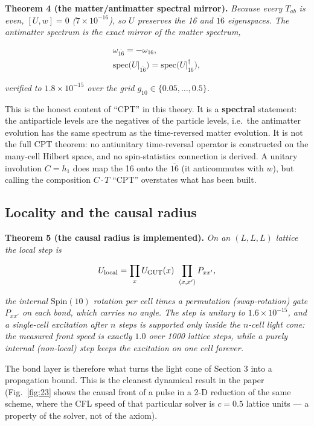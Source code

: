 \documentclass[aps,prd,twocolumn,amsmath,amssymb,superscriptaddress,nofootinbib,floatfix]{revtex4-2}
\begin{document}
\textbf{Theorem 4 (the matter/antimatter spectral mirror).}
\emph{Because every \(T_{ab}\) is even, \([U,w] = 0\)
(\(7\times10^{-16}\)), so \(U\) preserves the 16 and \(\overline{16}\)
eigenspaces. The antimatter spectrum is the exact mirror of the matter
spectrum,}

\begin{multline}
    \omega_{\overline{16}} = -\omega_{16},\qquad \\
    \mathrm{spec}\big(U\big|_{\overline{16}}\big) = \mathrm{spec}\big(U\big|_{16}^\dagger\big),
\end{multline}

\emph{verified to \(1.8\times10^{-15}\) over the grid
\(g_{10} \in \{0.05,\dots,0.5\}\).}

This is the honest content of ``CPT'' in this theory. It is a
\textbf{spectral} statement: the antiparticle levels are the negatives
of the particle levels, i.e.~the antimatter evolution has the same
spectrum as the time-reversed matter evolution. It is not the full CPT
theorem: no antiunitary time-reversal operator is constructed on the
many-cell Hilbert space, and no spin-statistics connection is derived. A
unitary involution \(C = h_1\) does map the 16 onto the
\(\overline{16}\) (it anticommutes with \(w\)), but calling the
composition \(C\cdot T\) ``CPT'' overstates what has been built.

\subsection{Locality and the causal
radius}\label{locality-and-the-causal-radius}

\textbf{Theorem 5 (the causal radius is implemented).} \emph{On an
\((L,L,L)\) lattice the local step is}

\[U_{\rm local} = \prod_x U_{\rm GUT}(x)\ \prod_{\langle x,x'\rangle} P_{xx'},\]

\emph{the internal \(\mathrm{Spin}(10)\) rotation per cell times a
permutation (swap-rotation) gate \(P_{xx'}\) on each bond, which carries
no angle. The step is unitary to \(1.6\times10^{-15}\), and a
single-cell excitation after \(n\) steps is supported only inside the
\(n\)-cell light cone: the measured front speed is exactly \(1.0\) over
1000 lattice steps, while a purely internal (non-local) step keeps the
excitation on one cell forever.}

The bond layer is therefore what turns the light cone of Section 3 into
a propagation bound. This is the cleanest dynamical result in the paper
(Fig.~\ref{fig:23} shows the causal front of a pulse in a 2-D reduction
of the same scheme, where the CFL speed of that particular solver is
\(c = 0.5\) lattice units --- a property of the solver, not of the
axiom).
\end{document}
